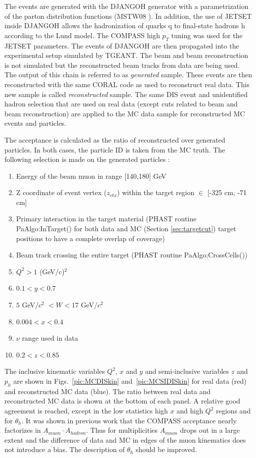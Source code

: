 The events are generated with the DJANGOH generator with a parametrization of the parton distribution functions (MSTW08 \cite{MSTW08}). In addition, the use of JETSET inside DJANGOH allows the hadronization of quarks q to final-state hadrons h according to the Lund model. The COMPASS high $p_T$ tuning was used for the JETSET parameters. The events of DJANGOH are then propagated into the experimental setup simulated by TGEANT. The beam and beam reconstruction is not simulated but the reconstructed beam tracks from data are being used. The output of this chain is referred to as \textit{generated} sample. These events are then reconstructed with the same CORAL code as used to reconstruct real data. This new sample is called \textit{reconstructed} sample. The same DIS event and unidentified hadron selection that are used on real data (except cuts related to beam and beam reconstruction) are applied to the MC data sample for reconstructed MC events and particles.

The acceptance is calculated as the ratio of reconstructed over generated particles. In both cases, the particle ID is taken from the MC truth. The following selection is made on the generated particles :

\begin{enumerate}
  \item Energy of the beam muon in range [140,180] GeV
	\item Z coordinate of event vertex ($z_{vtx}$) within the target region $\in$ [-325 cm, -71 cm]
	\item Primary interaction in the target material (PHAST routine PaAlgo:InTarget() for both data and MC (Section \ref{sec:targetcut}) target positions to have a complete overlap of coverage)
	\item Beam track crossing the entire target (PHAST routine PaAlgo:CrossCells())
  \item $Q^2>1$ (GeV/c)$^2$
  \item $0.1 < y < 0.7$
	\item $5$ GeV/$c^2$ $< W < 17$ GeV/$c^2$
  \item $0.004 < x < 0.4$
  \item $\nu$ range used in data
  \item $0.2 < z < 0.85$
\end{enumerate}

The inclusive kinematic variables $Q^2$, $x$ and $y$ and semi-inclusive variables $z$ and $p_h$ are shown in Figs.~\ref{pic:MCDISkin} and~\ref{pic:MCSIDISkin} for real data (red) and reconstructed MC data (blue). The ratio between real data and reconstructed MC data is shown at the bottom of each panel. A relative good agreement is reached, except in the low statistics high $x$ and high $Q^2$ regions and for $\theta_h$. It was shown in previous work that the COMPASS acceptance nearly factorizes in $A_{muon} \cdot A_{hadron}$. Thus for multiplicities $A_{muon}$ drops out in a large extent and the difference of data and MC in edges of the muon kinematics does not introduce a bias. The description of $\theta_h$ should be improved.

